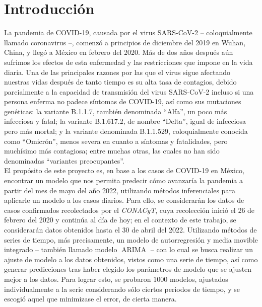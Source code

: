 \documentclass[11pt,letterpaper]{article}
\newcommand{\ARIMA}{\ensuremath{\operatorname{ARIMA}}}
\theoremstyle{definition}
\theoremstyle{theorem}
\theoremstyle{remark}
\begin{document}
	\section*{Introducción}
	\justify La pandemia de COVID-19, causada por el virus SARS-CoV-2 -- coloquialmente llamado coronavirus --, comenzó a principios de diciembre del 2019 en Wuhan, China, y llegó a México en febrero del 2020. Más de dos años después aún sufrimos los efectos de esta enfermedad y las restricciones que impone en la vida diaria. Una de las principales razones por las que el virus sigue afectando nuestras vidas después de tanto tiempo es su alta tasa de contagios, debido parcialmente a la capacidad de transmisión del virus SARS-CoV-2 incluso si una persona enferma no padece síntomas de COVID-19, así como sus mutaciones genéticas: la variante B.1.1.7, también denominada ``Alfa'', un poco más infecciosa y fatal\cite{fort2021model}; la variante B.1.617.2, de nombre ``Delta'', igual de infecciosa pero más mortal\cite{bian2021impact}; y la variante denominada B.1.1.529, coloquialmente conocida como ``Omicrón'', menos severa en cuanto a síntomas y fatalidades, pero muchísimo más contagiosa\cite{gowrisankar2022omicron}; entre muchas otras, las cuales no han sido denominadas ``variantes preocupantes''. \\
	\indent El propósito de este proyecto es, en base a los casos de COVID-19 en México, encontrar un modelo que nos permita predecir cómo avanzaría la pandemia a partir del mes de mayo del año 2022, utilizando métodos inferenciales para aplicarle un modelo a los casos diarios. Para ello, se considerarán los datos de casos confirmados recolectados por el \textit{CONACyT}\cite{web:conacyt}, cuya recolección inició el 26 de febrero del 2020 y continúa al día de hoy; en el contexto de este trabajo, se considerarán datos obtenidos hasta el 30 de abril del 2022. Utilizando métodos de series de tiempo, más precisamente, un modelo de autorregresión y media movible integrado -- también llamado modelo \(\ARIMA\) -- con lo cual se busca realizar un ajuste de modelo a los datos obtenidos, vistos como una serie de tiempo, así como generar predicciones tras haber elegido los parámetros de modelo que se ajusten mejor a los datos. Para lograr esto, se probaron \(1000\) modelos, ajustados individualmente a la serie considerando sólo ciertos periodos de tiempo, y se escogió aquel que minimizase el error, de cierta manera.
	\clearpage
	\rhead{\rightmark}
\end{document}

